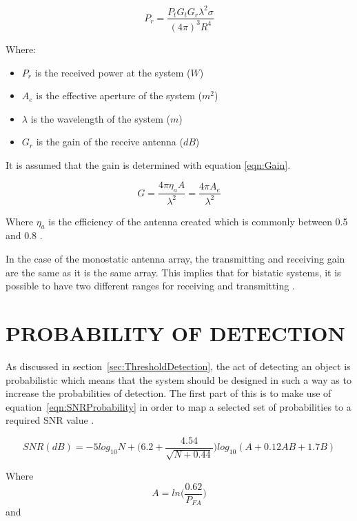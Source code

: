 \documentclass[11pt]{witseiepaper}
\begin{document}
\begin{bibunit}[witseie]
\begin{equation} \label{eqn:ReceivedPowerDerived}
P_{r} = \frac{P_{t} G_{t} G_{r} \lambda^2 \sigma}{(4 \pi )^3 R^4}
\end{equation}

Where:
\begin{itemize}
    \item $P_{r}$ is the received power at the system ($W$)
    \item $A_{e}$ is the effective aperture of the system ($m^2$)
    \item $\lambda$ is the wavelength of the system ($m$)
    \item $G_{r}$ is the gain of the receive antenna ($dB$)
\end{itemize}

It is assumed that the gain is determined with equation \ref{eqn:Gain}.

\begin{equation} \label{eqn:Gain}
G = \frac{4 \pi \eta_{a} A}{\lambda^2} = \frac{4 \pi A_{e}}{\lambda^2}
\end{equation}

Where $\eta_{a}$ is the efficiency of the antenna created which is commonly between 0.5 and 0.8 \cite[p.~64]{radarHandbook}.

In the case of the monostatic antenna array, the transmitting and receiving gain are the same as it is the same array. This implies that for bistatic systems, it is possible to have two different ranges for receiving and transmitting \cite[p.~64]{radarHandbook}.


\section{PROBABILITY OF DETECTION} \label{sec:SNRProbability}
As discussed in section~\ref{sec:ThresholdDetection}, the act of detecting an object is probabilistic which means that the system should be designed in such a way as to increase the probabilities of detection. 
The first part of this is to make use of equation~\ref{eqn:SNRProbability} in order to map a selected set of probabilities to a required SNR value \cite[p.~107]{radarHandbook}.

\begin{equation} \label{eqn:SNRProbability}
SNR (dB) = -5 log_{10}N + \Bigg(6.2 + \frac{4.54}{\sqrt{N + 0.44}}\Bigg) log_{10}(A + 0.12 A B + 1.7 B)
\end{equation}

Where 
\begin{equation} \label{eqn:A}
A = ln \Bigg( \frac{0.62}{P_{FA}} \Bigg)
\end{equation}
and 


\end{bibunit}
\end{document}
